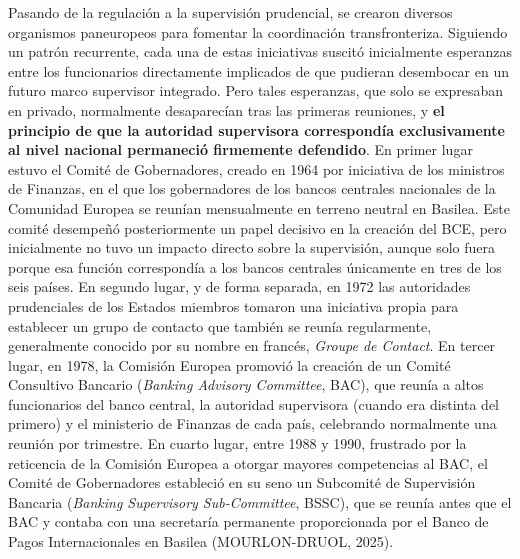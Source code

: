 \documentclass[10pt,a4paper]{article}
\begin{document}
{Pasando de la regulación a la supervisión prudencial, se crearon diversos organismos paneuropeos para fomentar la coordinación transfronteriza. Siguiendo un patrón recurrente, cada una de estas iniciativas suscitó inicialmente esperanzas entre los funcionarios directamente implicados de que pudieran desembocar en un futuro marco supervisor integrado. Pero tales esperanzas, que solo se expresaban en privado, normalmente desaparecían tras las primeras reuniones, y \textbf{el principio de que la autoridad supervisora correspondía exclusivamente al nivel nacional permaneció firmemente defendido}. En primer lugar estuvo el Comité de Gobernadores, creado en 1964 por iniciativa de los ministros de Finanzas, en el que los gobernadores de los bancos centrales nacionales de la Comunidad Europea se reunían mensualmente en terreno neutral en Basilea. Este comité desempeñó posteriormente un papel decisivo en la creación del BCE, pero inicialmente no tuvo un impacto directo sobre la supervisión, aunque solo fuera porque esa función correspondía a los bancos centrales únicamente en tres de los seis países. En segundo lugar, y de forma separada, en 1972 las autoridades prudenciales de los Estados miembros tomaron una iniciativa propia para establecer un grupo de contacto que también se reunía regularmente, generalmente conocido por su nombre en francés, \textit{Groupe de Contact}. En tercer lugar, en 1978, la Comisión Europea promovió la creación de un Comité Consultivo Bancario (\textit{Banking Advisory Committee}, BAC), que reunía a altos funcionarios del banco central, la autoridad supervisora (cuando era distinta del primero) y el ministerio de Finanzas de cada país, celebrando normalmente una reunión por trimestre. En cuarto lugar, entre 1988 y 1990, frustrado por la reticencia de la Comisión Europea a otorgar mayores competencias al BAC, el Comité de Gobernadores estableció en su seno un Subcomité de Supervisión Bancaria (\textit{Banking Supervisory Sub-Committee}, BSSC), que se reunía antes que el BAC y contaba con una secretaría permanente proporcionada por el Banco de Pagos Internacionales en Basilea (MOURLON-DRUOL, 2025).

}
\end{document}
